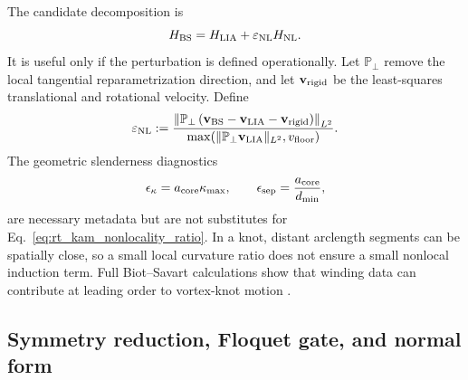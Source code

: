 The candidate decomposition is
\begin{equation}
    H_{\rm BS}
    =
    H_{\rm LIA}
    +
    \varepsilon_{\rm NL}H_{\rm NL}.
    \label{eq:rt_kam_lia_full_bs_decomposition}
\end{equation}
It is useful only if the perturbation is defined operationally.  Let
\(\mathbb P_{\perp}\) remove the local tangential reparametrization direction,
and let \(\mathbf v_{\rm rigid}\) be the least-squares translational and
rotational velocity.  Define
\begin{equation}
    \varepsilon_{\rm NL}
    :=
    \frac{
    \left\lVert
    \mathbb P_{\perp}
    \left(
    \mathbf v_{\rm BS}
    -\mathbf v_{\rm LIA}
    -\mathbf v_{\rm rigid}
    \right)
    \right\rVert_{L^2}
    }{
    \max\!\left(
    \lVert\mathbb P_{\perp}\mathbf v_{\rm LIA}\rVert_{L^2},
    v_{\rm floor}
    \right)
    }.
    \label{eq:rt_kam_nonlocality_ratio}
\end{equation}
The geometric slenderness diagnostics
\begin{equation}
    \epsilon_{\kappa}
    =
    a_{\rm core}\kappa_{\max},
    \qquad
    \epsilon_{\rm sep}
    =
    \frac{a_{\rm core}}{d_{\min}},
    \label{eq:rt_kam_slenderness_diagnostics}
\end{equation}
are necessary metadata but are not substitutes for
Eq.~\eqref{eq:rt_kam_nonlocality_ratio}.  In a knot, distant arclength
segments can be spatially close, so a small local curvature ratio does not
ensure a small nonlocal induction term.  Full Biot--Savart calculations show
that winding data can contribute at leading order to vortex-knot motion
\cite{ObertiRicca2019WindingDynamics}.

\subsection{Symmetry reduction, Floquet gate, and normal form}
\label{subsec:rt_kam_floquet_normal_form}

